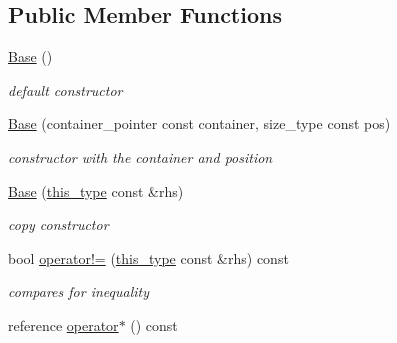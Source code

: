 \subsection*{Public Member Functions}
\begin{DoxyCompactItemize}
\item 
\hypertarget{classhryky_1_1iterator_1_1random_1_1_base_a81d186e541d1475dedaa204f1ae5d321}{\hyperlink{classhryky_1_1iterator_1_1random_1_1_base_a81d186e541d1475dedaa204f1ae5d321}{Base} ()}\label{classhryky_1_1iterator_1_1random_1_1_base_a81d186e541d1475dedaa204f1ae5d321}

\begin{DoxyCompactList}\small\item\em default constructor \end{DoxyCompactList}\item 
\hypertarget{classhryky_1_1iterator_1_1random_1_1_base_a0845b57755dfd114fbd1d9c658b415fa}{\hyperlink{classhryky_1_1iterator_1_1random_1_1_base_a0845b57755dfd114fbd1d9c658b415fa}{Base} (container\-\_\-pointer const container, size\-\_\-type const pos)}\label{classhryky_1_1iterator_1_1random_1_1_base_a0845b57755dfd114fbd1d9c658b415fa}

\begin{DoxyCompactList}\small\item\em constructor with the container and position \end{DoxyCompactList}\item 
\hypertarget{classhryky_1_1iterator_1_1random_1_1_base_a68224dc6ab2753f1d8123d854c46ef2f}{\hyperlink{classhryky_1_1iterator_1_1random_1_1_base_a68224dc6ab2753f1d8123d854c46ef2f}{Base} (\hyperlink{classhryky_1_1iterator_1_1random_1_1_base}{this\-\_\-type} const \&rhs)}\label{classhryky_1_1iterator_1_1random_1_1_base_a68224dc6ab2753f1d8123d854c46ef2f}

\begin{DoxyCompactList}\small\item\em copy constructor \end{DoxyCompactList}\item 
\hypertarget{classhryky_1_1iterator_1_1random_1_1_base_a7b9bf1ad652b48849f90785bc8408a10}{bool \hyperlink{classhryky_1_1iterator_1_1random_1_1_base_a7b9bf1ad652b48849f90785bc8408a10}{operator!=} (\hyperlink{classhryky_1_1iterator_1_1random_1_1_base}{this\-\_\-type} const \&rhs) const }\label{classhryky_1_1iterator_1_1random_1_1_base_a7b9bf1ad652b48849f90785bc8408a10}

\begin{DoxyCompactList}\small\item\em compares for inequality \end{DoxyCompactList}\item 
\hypertarget{classhryky_1_1iterator_1_1random_1_1_base_ac855b032c30109ee9e8c2fa3796c2990}{reference \hyperlink{classhryky_1_1iterator_1_1random_1_1_base_ac855b032c30109ee9e8c2fa3796c2990}{operator$\ast$} () const }\label{classhryky_1_1iterator_1_1random_1_1_base_ac855b032c30109ee9e8c2fa3796c2990}


\end{DoxyCompactItemize}
